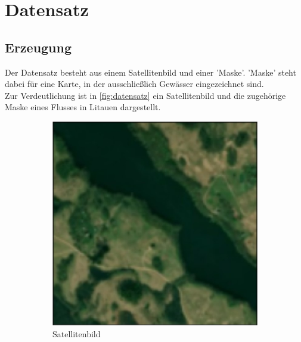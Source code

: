 \section{Datensatz}
\label{sec:datensatz}
\subsection{Erzeugung}
Der Datensatz besteht aus einem Satellitenbild und einer 'Maske'.
'Maske' steht dabei für eine Karte, in der ausschließlich Gewässer eingezeichnet sind.
\\
Zur Verdeutlichung ist in \autoref{fig:datensatz} ein Satellitenbild und die zugehörige Maske eines Flusses in Litauen dargestellt.
\begin{figure}
    \begin{subfigure}{0.48\textwidth}
        \centering
        \includegraphics[width=\textwidth]{content/img/datensatz_satellite.jpg}
        \caption{Satellitenbild}
    \end{subfigure}
    \hfill
    \begin{subfigure}{0.48\textwidth}
        \centering

\end{subfigure}
\end{figure}
